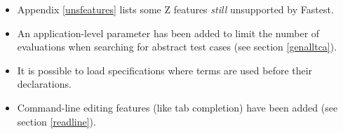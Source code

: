 \begin{itemize}
\item Appendix \ref{unsfeatures} lists some Z features {\it still} unsupported by Fastest.

\item An application-level parameter has been added to limit the number of evaluations when searching for abstract test cases (see section \ref{genalltca}).

\item It is possible to load specifications where terms are used before their declarations.

\item Command-line editing features (like tab completion) have been added (see section \ref{readline}).

\end{itemize}


